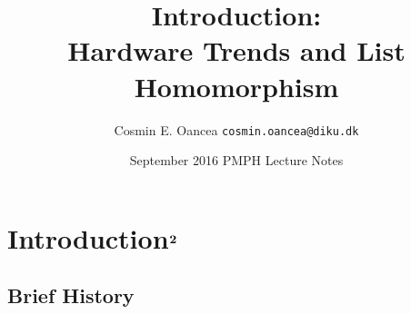 \documentclass{beamer}
\title[Intro]{Introduction:\\Hardware Trends and List Homomorphism}
\author[C.~Oancea]{Cosmin E. Oancea {\tt cosmin.oancea@diku.dk}}
\institute{Department of Computer Science (DIKU)\\University of Copenhagen}
\date[Sept 2016]{September 2016 PMPH Lecture Notes}
\begin{document}
\titleslide


\begin{frame}[fragile]
	\tableofcontents
\end{frame}



\section{Introduction$^{\mbox{\bf 2}}$}

\subsection{Brief History}
\end{document}
